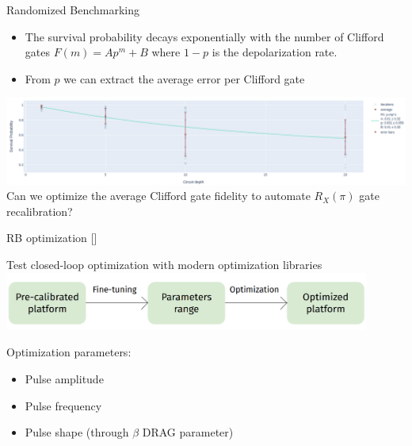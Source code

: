 \documentclass[aspectratio=169,10pt]{beamer}
\begin{document}
\begin{frame}[t,fragile]{Randomized Benchmarking}
  \begin{itemize}
    \item The survival probability decays exponentially with the number of Clifford gates $F(m) = Ap^m + B$ where $1-p$ is the depolarization rate.
    \item From $p$ we can extract the average error per Clifford gate
  \end{itemize}
  \begin{center}
    \vspace{0.5em}
    \includegraphics[width=\textwidth]{figures/rb.png}
    \vspace{1.25em}
    Can we optimize the average Clifford gate fidelity to automate $R_X(\pi)$ gate recalibration? 
  \end{center}
\end{frame}

\begin{frame}[t,fragile]{RB optimization [\cite{kelly_optimal_2014}]}
  \begin{center}
    Test closed-loop optimization with modern optimization libraries
    \vspace{1.25em}
    \includegraphics[width=0.9\textwidth]{figures/opt_workflow.png}
  \end{center}
  \vspace{1.25em}
  Optimization parameters:
  \begin{itemize}
    \item Pulse amplitude
    \item Pulse frequency
    \item Pulse shape (through $\beta$ DRAG parameter)
  \end{itemize}
\end{frame}
\end{document}
